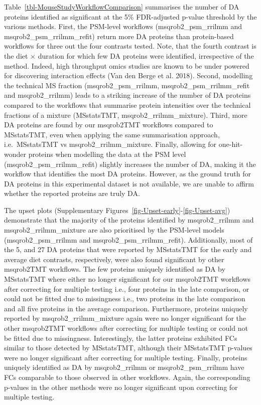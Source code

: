 \documentclass[
  letterpaper,
  DIV=11,
  numbers=noendperiod]{scrartcl}
\begin{document}
Table~\ref{tbl-MouseStudyWorkflowComparison} summarises the number of DA
proteins identified as significant at the 5\% FDR-adjusted p-value
threshold by the various methods. First, the PSM-level workflows
(msqrob2\_psm\_rrilmm and msqrob2\_psm\_rrilmm\_refit) return more DA
proteins than protein-based workflows for three out the four contrasts
tested. Note, that the fourth contrast is the diet \(\times\) duration
for which few DA proteins were identified, irrespective of the method.
Indeed, high throughput omics studies are known to be under powered for
discovering interaction effects (Van den Berge et al. 2018). Second,
modelling the technical MS fraction (msqrob2\_psm\_rrilmm,
msqrob2\_psm\_rrilmm\_refit and msqrob2\_rrilmm) leads to a striking
increase of the number of DA proteins compared to the workflows that
summarise protein intensities over the technical fractions of a mixture
(MSstatsTMT, msqrob2\_rrilmm\_mixture). Third, more DA proteins are
found by our msqrob2TMT workflows compared to MSstatsTMT, even when
applying the same summarisation approach, i.e.~MSstatsTMT vs
msqrob2\_rrilmm\_mixture. Finally, allowing for one-hit-wonder proteins
when modelling the data at the PSM level (msqrob2\_psm\_rrilmm\_refit)
slightly increases the number of DA, making it the workflow that
identifies the most DA proteins. However, as the ground truth for DA
proteins in this experimental dataset is not available, we are unable to
affirm whether the reported proteins are truly DA.

The upset plots (Supplementary
Figures~\ref{fig-Upset-early}-\ref{fig-Upset-avg}) demonstrate that the
majority of the proteins identified by msqrob2\_rrilmm and
msqrob2\_rrilmm\_mixture are also prioritised by the PSM-level models
(msqrob2\_psm\_rrilmm and msqrob2\_psm\_rrilmm\_refit). Additionally,
most of the 5, and 27 DA proteins that were reported by MSstatsTMT for
the early and average diet contrasts, respectively, were also found
significant by other msqrob2TMT workflows. The few proteins uniquely
identified as DA by MSstatsTMT where either no longer significant for
our msqrob2TMT workflows after correcting for multiple testing i.e.,
four proteins in the late comparison, or could not be fitted due to
missingness i.e., two proteins in the late comparison and all five
proteins in the average comparison. Furthermore, proteins uniquely
reported by msqrob2\_rrilmm\_mixture again were no longer significant
for the other msqrob2TMT workflows after correcting for multiple testing
or could not be fitted due to missingness. Interestingly, the latter
proteins exhibited FCs similar to those detected by MSstatsTMT, although
their MSstatsTMT p-values were no longer significant after correcting
for multiple testing. Finally, proteins uniquely identified as DA by
msqrob2\_rrilmm or msqrob2\_psm\_rrilmm have FCs comparable to those
observed in other workflows. Again, the corresponding p-values in the
other methods were no longer significant upon correcting for multiple
testing.
\end{document}
